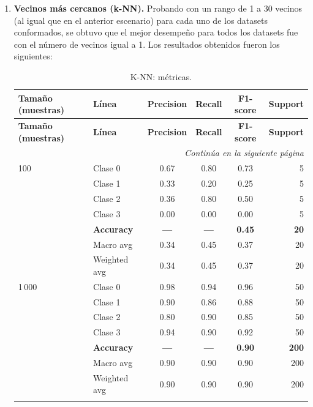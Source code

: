 \documentclass[12pt,a4paper]{article}
\begin{document}
\begin{enumerate}
  \item \textbf{Vecinos más cercanos (k-NN).}
  Probando con un rango de 1 a 30 vecinos (al igual que en el anterior escenario) para cada uno de los datasets conformados, se obtuvo que el mejor 
  desempeño para todos los datasets fue con el número de vecinos igual a 1. Los resultados obtenidos fueron los siguientes:
  
  \small
  \setlength{\tabcolsep}{4pt}
  \begin{longtable}{@{}l l c c c r@{}}
    \toprule
    \textbf{Tamaño (muestras)} & \textbf{Línea} & \textbf{Precision} & \textbf{Recall} & \textbf{F1-score} & \textbf{Support} \\
    \midrule
    \endfirsthead

    \toprule
    \textbf{Tamaño (muestras)} & \textbf{Línea} & \textbf{Precision} & \textbf{Recall} & \textbf{F1-score} & \textbf{Support} \\
    \midrule
    \endhead

    \midrule
    \multicolumn{6}{r}{\emph{Continúa en la siguiente página}} \\
    \endfoot

    \bottomrule
    \caption{K-NN: métricas.}
    \label{tab:knn_metr_size}
    \endlastfoot

    100   & Clase 0       & 0.67 & 0.80 & 0.73 & 5 \\
          & Clase 1       & 0.33 & 0.20 & 0.25 & 5 \\
          & Clase 2       & 0.36 & 0.80 & 0.50 & 5 \\
          & Clase 3       & 0.00 & 0.00 & 0.00 & 5 \\
          & \textbf{Accuracy}    & \textbf{—}   & \textbf{—}   & \textbf{0.45} & \textbf{20} \\
          & Macro avg     & 0.34 & 0.45 & 0.37 & 20 \\
          & Weighted avg  & 0.34 & 0.45 & 0.37 & 20 \\
    \addlinespace

    1\,000 & Clase 0      & 0.98 & 0.94 & 0.96 & 50 \\
          & Clase 1       & 0.90 & 0.86 & 0.88 & 50 \\
          & Clase 2       & 0.80 & 0.90 & 0.85 & 50 \\
          & Clase 3       & 0.94 & 0.90 & 0.92 & 50 \\
          & \textbf{Accuracy}    & \textbf{—}   & \textbf{—}   & \textbf{0.90} & \textbf{200} \\
          & Macro avg     & 0.90 & 0.90 & 0.90 & 200 \\
          & Weighted avg  & 0.90 & 0.90 & 0.90 & 200 \\
    \addlinespace


\end{longtable}
\end{enumerate}
\end{document}
